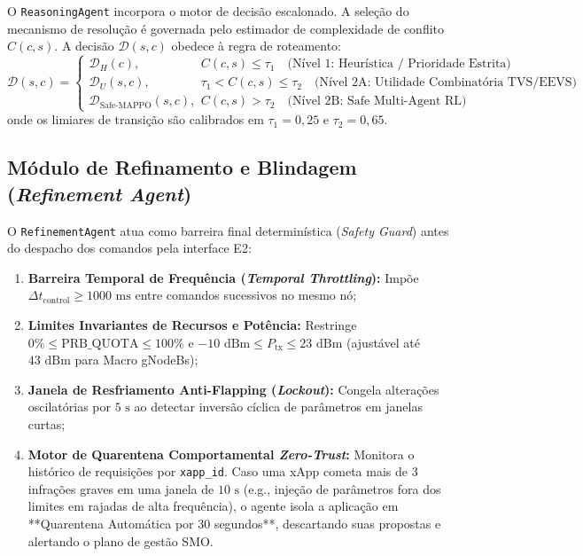 \documentclass[12pt]{article}
\begin{document}
O \texttt{ReasoningAgent} incorpora o motor de decisão escalonado. A seleção do mecanismo de resolução é governada pelo estimador de complexidade de conflito $C(c, s)$. A decisão $\mathcal{D}(s, c)$ obedece à regra de roteamento:
\begin{equation}
\mathcal{D}(s, c) = 
\begin{cases} 
\mathcal{D}_H(c), & C(c, s) \le \tau_1 \quad \text{(Nível 1: Heurística / Prioridade Estrita)} \\ 
\mathcal{D}_U(s, c), & \tau_1 < C(c, s) \le \tau_2 \quad \text{(Nível 2A: Utilidade Combinatória TVS/EEVS)} \\ 
\mathcal{D}_{\text{Safe-MAPPO}}(s, c), & C(c, s) > \tau_2 \quad \text{(Nível 2B: Safe Multi-Agent RL)} 
\end{cases}
\end{equation}
onde os limiares de transição são calibrados em $\tau_1 = 0,25$ e $\tau_2 = 0,65$.

\subsection{Módulo de Refinamento e Blindagem (\textit{Refinement Agent})}

O \texttt{RefinementAgent} atua como barreira final determinística (\textit{Safety Guard}) antes do despacho dos comandos pela interface E2:
\begin{enumerate}
    \item \textbf{Barreira Temporal de Frequência (\textit{Temporal Throttling}):} Impõe $\Delta t_{\text{control}} \ge 1000\text{ ms}$ entre comandos sucessivos no mesmo nó;
    \item \textbf{Limites Invariantes de Recursos e Potência:} Restringe $0\% \le \text{PRB\_QUOTA} \le 100\%$ e $-10\text{ dBm} \le P_{\text{tx}} \le 23\text{ dBm}$ (ajustável até $43\text{ dBm}$ para Macro gNodeBs);
    \item \textbf{Janela de Resfriamento Anti-Flapping (\textit{Lockout}):} Congela alterações oscilatórias por $5\text{ s}$ ao detectar inversão cíclica de parâmetros em janelas curtas;
    \item \textbf{Motor de Quarentena Comportamental \textit{Zero-Trust}:} Monitora o histórico de requisições por \texttt{xapp\_id}. Caso uma xApp cometa mais de 3 infrações graves em uma janela de $10\text{ s}$ (e.g., injeção de parâmetros fora dos limites em rajadas de alta frequência), o agente isola a aplicação em **Quarentena Automática por 30 segundos**, descartando suas propostas e alertando o plano de gestão SMO.
\end{enumerate}
\end{document}
